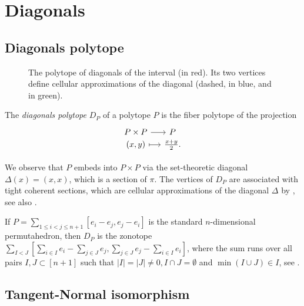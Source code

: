 
\section{Diagonals}


\subsection{Diagonals polytope}

\begin{figure}
	\centering
	
	\caption{The polytope of diagonals of the interval (in red). Its two vertices define cellular approximations of the diagonal (dashed, in blue, and in green).}
	\label{figure:cellularapproximation}
\end{figure}

\begin{definition}
	The \emph{diagonals polytope} $D_P$ of a polytope $P$ is the fiber polytope of the projection
	\[
	\begin{tikzcd}[row sep=-2,column sep=small]
		P \times P \arrow[r] & P \\
		(x,y) \arrow[r,mapsto] &\textstyle\frac{x+y}{2}.
	\end{tikzcd}
	\]
\end{definition}

We observe that $P$ embeds into $P\times P$ via the set-theoretic diagonal $\Delta (x)=(x,x)$, which is a section of $\pi$.
The vertices of $D_P$ are associated with tight coherent sections, which are cellular approximations of the diagonal $\Delta$ by \cite[Proposition 5]{MTTV19}, see also \cite[Proposition 1.1]{GLA21}.

\begin{example} \label{e:permutahedron}
	If $P=\sum_{1 \leq i<j \leq n+1} [e_i-e_j, e_j-e_i]$ is the standard $n$-dimensional permutahedron, then $D_P$ is the zonotope $\sum_{I<J} [\sum_{i \in I}e_i - \sum_{j \in J}e_j, \sum_{j \in J} e_j - \sum_{i \in I}e_i]$, where the sum runs over all pairs $I,J\subset [n+1]$ such that $|I|=|J|\neq 0, I\cap J = \emptyset$ and $\min(I \cup J) \in I$, see \cite[Theorem 3.6]{GLA21}.
\end{example}

\subsection{Tangent-Normal isomorphism}

